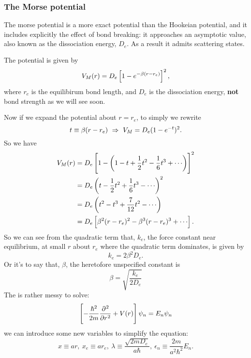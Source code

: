 \subsubsection{The Morse potential}
\label{morsepot}
The morse potential is a more exact potential than the Hookeian potential, 
and it includes explicitly the effect of bond breaking: it approaches 
an asymptotic value, also known as the dissociation energy, $D_e$. As a result 
it admits scattering states. 
\begin{defi}
The potential is given by 
\begin{equation}
V_M(r)=D_e\left[1-e^{-\beta(r-r_e)} \right]^2, 
\end{equation}
where $r_e$ is the equilibirum bond length, and $D_e$ is the dissociation energy, 
\textbf{not} bond strength as we will see soon. 
\end{defi}
Now if we expand the potential about $r=r_e$, to simply we rewrite
\begin{equation}
t\equiv\beta(r-r_e)\ \imp\ V_M=D_e(1-e^{-t})^2.
\end{equation}
So we have
\begin{equation}
\begin{aligned}
V_M(r)&=D_e\lf[1-\lf(1-t+\frac{1}{2}t^2-\frac{1}{6}t^3+\cdots \rt) \rt]^2\\
&=D_e\lf(t-\frac{1}{2}t^2+\frac{1}{6}t^3-\cdots \rt)^2\\
&=D_e\lf(t^2-t^3+\frac{7}{12}t^2-\cdots \rt)\\
&=D_e\lf[\beta^2(r-r_e)^2-\beta^3(r-r_e)^3+\cdots \rt]. 
\end{aligned}
\end{equation}
So we can see from the quadratic term that, $k_e$, the force 
constant near equilibrium, \ie at small $r$ about $r_e$ where 
the quadratic term dominates, is given by 
\begin{equation}
k_e=2\beta^2D_e.
\end{equation}
Or it's to say that, $\beta$, the heretofore unspecified constant is
\begin{equation}
\beta=\sqrt{\frac{k_e}{2D_e}}
\end{equation}
The \sch is rather messy to solve: 
\begin{equation}
\lf[-\frac{\hbar^2}{2m}\diffp[2]{}{r}+V(r) \rt]\psi_n=E_n\psi_n
\end{equation}
we can introduce some new variables to simplify the equation:
\begin{equation}
x\equiv ar,\ x_e\equiv ar_e,\ \lambda\equiv\frac{\sqrt{2mD_e}}{a\hbar},\ \epsilon_n\equiv\frac{2m}{a^2\hbar^2}E_n. 
\end{equation}
